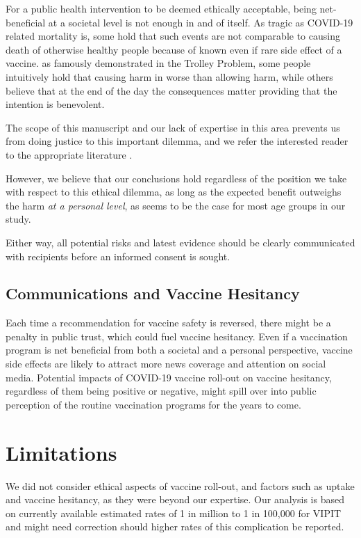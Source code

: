 \documentclass[]{interact}
\theoremstyle{plain}%
\theoremstyle{definition}
\theoremstyle{remark}
\begin{document}
For a public health intervention to be deemed ethically acceptable,
being net-beneficial at a societal level is not enough in and of itself.
As tragic as COVID-19 related mortality is, some hold that such events
are not comparable to causing death of otherwise healthy people because
of known even if rare side effect of a vaccine. as famously demonstrated
in the Trolley Problem, some people intuitively hold that causing harm
in worse than allowing harm, while others believe that at the end of the
day the consequences matter providing that the intention is benevolent.

The scope of this manuscript and our lack of expertise in this area
prevents us from doing justice to this important dilemma, and we refer
the interested reader to the appropriate literature
\citep{woollard_doing_2016}.

However, we believe that our conclusions hold regardless of the position
we take with respect to this ethical dilemma, as long as the expected
benefit outweighs the harm \emph{at a personal level}, as seems to be
the case for most age groups in our study.

Either way, all potential risks and latest evidence should be clearly
communicated with recipients before an informed consent is sought.

\hypertarget{communications-and-vaccine-hesitancy}{%
\subsection{Communications and Vaccine
Hesitancy}\label{communications-and-vaccine-hesitancy}}

Each time a recommendation for vaccine safety is reversed, there might
be a penalty in public trust, which could fuel vaccine hesitancy. Even
if a vaccination program is net beneficial from both a societal and a
personal perspective, vaccine side effects are likely to attract more
news coverage and attention on social media. Potential impacts of
COVID-19 vaccine roll-out on vaccine hesitancy, regardless of them being
positive or negative, might spill over into public perception of the
routine vaccination programs for the years to come.

\hypertarget{limitations}{%
\section{Limitations}\label{limitations}}

We did not consider ethical aspects of vaccine roll-out, and factors
such as uptake and vaccine hesitancy, as they were beyond our expertise.
Our analysis is based on currently available estimated rates of 1 in
million to 1 in 100,000 for VIPIT and might need correction should
higher rates of this complication be reported.
\end{document}
